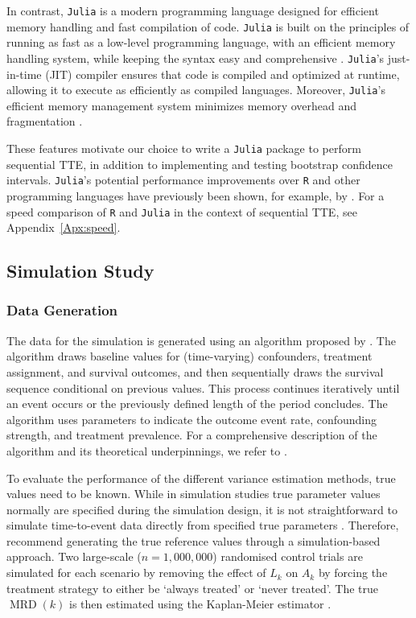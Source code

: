 \documentclass[pdflatex,sn-vancouver-ay]{sn-jnl}%
\theoremstyle{thmstyleone}%
\theoremstyle{thmstyletwo}%
\theoremstyle{thmstylethree}%
\newcommand{\Rlang}{\texttt{R}}
\newcommand{\julia}{\texttt{Julia}}
\begin{document}
In contrast, \julia{} is a modern programming language designed for efficient memory handling and fast compilation of code. \julia{} is built on the principles of running as fast as a low-level programming language, with an efficient memory handling system, while keeping the syntax easy and comprehensive \citep{alWhyWeCreated}. \julia{}'s just-in-time (JIT) compiler ensures that code is compiled and optimized at runtime, allowing it to execute as efficiently as compiled languages. Moreover, \julia{}'s efficient memory management system minimizes memory overhead and fragmentation \citep{bezansonJuliaFreshApproach2017}. 

These features motivate our choice to write a \julia{} package to perform sequential TTE, in addition to implementing and testing bootstrap confidence intervals. \julia{}'s potential performance improvements over \Rlang{} and other programming languages have previously been shown, for example, by \cite{van_amsterdam2024}. For a speed comparison of \Rlang{} and \julia{} in the context of sequential TTE, see Appendix~\ref{Apx:speed}.

\subsection{Simulation Study}\label{sec:SimulationStudy}
\subsubsection{Data Generation}\label{sec:DataGeneration}

The data for the simulation is generated using an algorithm proposed by \cite{youngSimulationKnownCox2014}. The algorithm draws baseline values for (time-varying) confounders, treatment assignment, and survival outcomes, and then sequentially draws the survival sequence conditional on previous values. This process continues iteratively until an event occurs or the previously defined length of the period concludes. The algorithm uses parameters to indicate the outcome event rate, confounding strength, and treatment prevalence. For a comprehensive description of the algorithm and its theoretical underpinnings, we refer to \cite{youngSimulationKnownCox2014}.

To evaluate the performance of the different variance estimation methods, true values need to be known. While in simulation studies true parameter values normally are specified during the simulation design, it is not straightforward to simulate time-to-event data directly from specified true parameters \citep{youngSimulationKnownCox2014, keoghCausalInferenceSurvival2023}. Therefore, \cite{keoghCausalInferenceSurvival2023} recommend generating the true reference values through a simulation-based approach. Two large-scale ($n = 1,000,000$) randomised control trials are simulated for each scenario by removing the effect of $L_k$ on $A_k$ by forcing the treatment strategy to either be `always treated' or `never treated'. The true $\operatorname{MRD}(k)$ is then estimated using the Kaplan-Meier estimator \citep{keoghCausalInferenceSurvival2023}.
\end{document}
